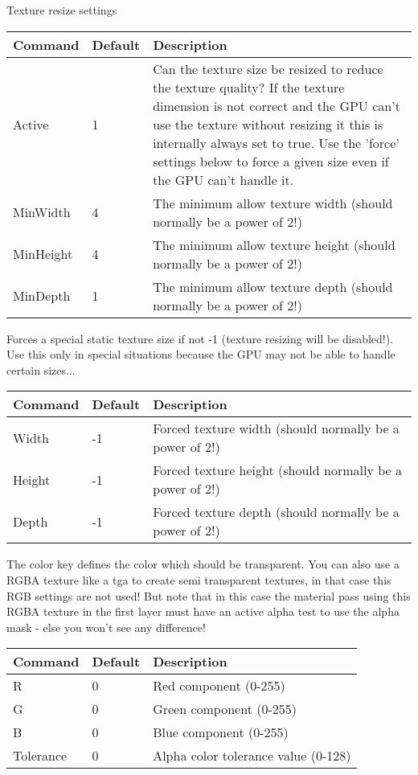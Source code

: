 Texture resize settings\\

\begin{tabular}{|p{2.5cm}|p{2.5cm}|p{9cm}|}
\hline
\textbf{Command} & \textbf{Default} & \textbf{Description}\\
\hline
Active	  & 1 & Can the texture size be resized to reduce the texture quality? If the texture dimension
                is not correct and the \ac{GPU} can't use the texture without resizing it this is internally
                always set to true. Use the 'force' settings below to force a given size even if the \ac{GPU}
                can't handle it.\\
\hline
MinWidth  & 4 & The minimum allow texture width (should normally be a power of 2!)\\
\hline
MinHeight & 4 & The minimum allow texture height (should normally be a power of 2!)\\
\hline
MinDepth  & 1 & The minimum allow texture depth (should normally be a power of 2!)\\
\hline
\end{tabular}


Forces a special static texture size if not -1 (texture resizing will be disabled!).\\
Use this only in special situations because the \ac{GPU} may not be able to handle certain
sizes...

\begin{tabular}{|p{2.5cm}|p{2.5cm}|p{9cm}|}
\hline
\textbf{Command} & \textbf{Default} & \textbf{Description}\\
\hline
Width  & -1 & Forced texture width (should normally be a power of 2!)\\
\hline
Height & -1 & Forced texture height (should normally be a power of 2!)\\
\hline
Depth  & -1 & Forced texture depth (should normally be a power of 2!)\\
\hline
\end{tabular}


The color key defines the color which should be transparent.
You can also use a RGBA texture like a tga to create semi transparent textures, in that
case this RGB settings are not used! But note that in this case the material pass using this
RGBA texture in the first layer must have an active alpha test to use the alpha mask - else
you won't see any difference!\\

\begin{tabular}{|p{2.5cm}|p{2.5cm}|p{9cm}|}
\hline
\textbf{Command} & \textbf{Default} & \textbf{Description}\\
\hline
R		  & 0 & Red component (0-255)\\
\hline
G		  & 0 & Green component (0-255)\\
\hline
B		  & 0 & Blue component (0-255)\\
\hline
Tolerance & 0 & Alpha color tolerance value (0-128)\\
\hline
\end{tabular}



